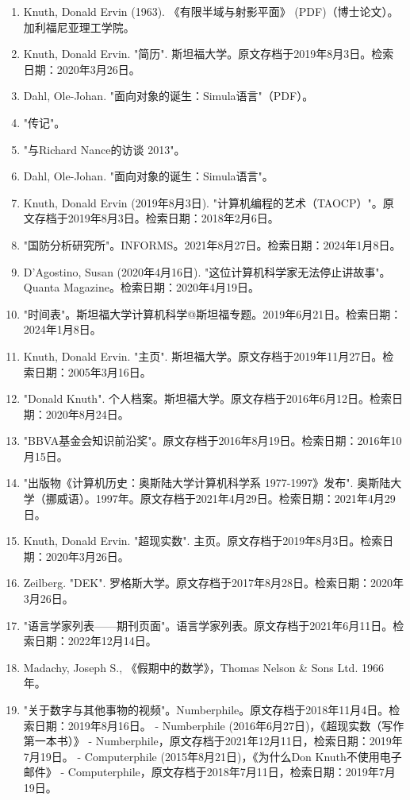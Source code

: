\begin{enumerate}
\item Knuth, Donald Ervin (1963). 《有限半域与射影平面》 (PDF)（博士论文）。加利福尼亚理工学院。
\item Knuth, Donald Ervin. "简历". 斯坦福大学。原文存档于2019年8月3日。检索日期：2020年3月26日。
\item Dahl, Ole-Johan. "面向对象的诞生：Simula语言"（PDF）。
\item "传记"。
\item "与Richard Nance的访谈 2013"。
\item Dahl, Ole-Johan. "面向对象的诞生：Simula语言"。
\item Knuth, Donald Ervin (2019年8月3日). "计算机编程的艺术（TAOCP）"。原文存档于2019年8月3日。检索日期：2018年2月6日。
\item "国防分析研究所"。INFORMS。2021年8月27日。检索日期：2024年1月8日。
\item D'Agostino, Susan (2020年4月16日). "这位计算机科学家无法停止讲故事"。Quanta Magazine。检索日期：2020年4月19日。
\item "时间表"。斯坦福大学计算机科学@斯坦福专题。2019年6月21日。检索日期：2024年1月8日。
\item Knuth, Donald Ervin. "主页". 斯坦福大学。原文存档于2019年11月27日。检索日期：2005年3月16日。
\item "Donald Knuth". 个人档案。斯坦福大学。原文存档于2016年6月12日。检索日期：2020年8月24日。
\item "BBVA基金会知识前沿奖"。原文存档于2016年8月19日。检索日期：2016年10月15日。
\item "出版物《计算机历史：奥斯陆大学计算机科学系 1977-1997》发布". 奥斯陆大学（挪威语）。1997年。原文存档于2021年4月29日。检索日期：2021年4月29日。
\item Knuth, Donald Ervin. "超现实数". 主页。原文存档于2019年8月3日。检索日期：2020年3月26日。
\item Zeilberg. "DEK". 罗格斯大学。原文存档于2017年8月28日。检索日期：2020年3月26日。
\item "语言学家列表——期刊页面"。语言学家列表。原文存档于2021年6月11日。检索日期：2022年12月14日。
\item Madachy, Joseph S., 《假期中的数学》，Thomas Nelson & Sons Ltd. 1966年。
\item "关于数字与其他事物的视频"。Numberphile。原文存档于2018年11月4日。检索日期：2019年8月16日。
- Numberphile (2016年6月27日)，《超现实数（写作第一本书）》 - Numberphile，原文存档于2021年12月11日，检索日期：2019年7月19日。
- Computerphile (2015年8月21日)，《为什么Don Knuth不使用电子邮件》 - Computerphile，原文存档于2018年7月11日，检索日期：2019年7月19日。

\end{enumerate}
